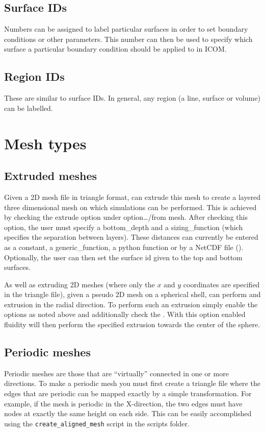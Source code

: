 \subsection{Surface IDs}\label{sect:surface_ids}
Numbers can be assigned to label particular surfaces in order to set boundary conditions or other parameters. This number can then be used to specify which surface a particular boundary condition should be applied to in ICOM.

\subsection{Region IDs}\label{sect:region_ids}
These are similar to surface IDs. In general, any region (a line, surface or volume) can be labelled.

\section{Mesh types}
\subsection{Extruded meshes}
\label{sect:extruded_meshes}

Given a 2D mesh file in triangle format, \fluidity can extrude this mesh to create a layered three dimensional mesh 
on which simulations can be performed. This is achieved by checking the extrude option under 
option{\ldots/from mesh}. After checking this option, the user must specify a bottom\_depth and 
a sizing\_function (which specifies the separation between layers). These distances can 
currently be entered as a constant, a generic\_function, a python function or by a NetCDF 
file (\website). Optionally, the user can then set the surface id given to the top and bottom surfaces. 

As well as extruding 2D meshes (where only the $x$ and $y$ coordinates are specified in the triangle file),
given a pseudo 2D mesh on a spherical shell, \fluidity can perform and extrusion in the radial 
direction. To perform such an extrusion simply enable the options as noted above and additionally 
check the . With this option enabled fluidity will then perform the 
specified extrusion towards the center of the sphere.

\subsection{Periodic meshes}
\label{mesh!mesh types!periodic} 
Periodic meshes are those that are ``virtually'' connected in one or more directions. To make a periodic
mesh you must first create a triangle file where the edges that are periodic
can be mapped exactly by a simple transformation. For example, if the mesh
is periodic in the X-direction, the two edges must have nodes at exactly the
same height on each side. This can be easily accomplished using the
\lstinline[language=Bash]+create_aligned_mesh+ script in the scripts folder.

